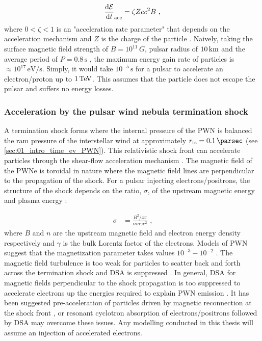 \begin{equation}
    \begin{aligned}
    \dv{\mathcal{E}}{t}_\text{acc}=\zeta Zec^2B\text{ ,}
    \end{aligned}
\end{equation}
where $0<\zeta<1$ is an "acceleration rate parameter" that depends on the acceleration mechanism and $Z$ is the charge of the particle \citep{2022arXiv221116020T}. Naively, taking the surface magnetic field strength of $B=10^{11}\,\si{G}$, pulsar radius of $10\,\si{\kilo\meter}$ and the average period of $P=0.8\,\si{\second}$ \citep{2005AJ....129.1993M}, the maximum energy gain rate of particles is $\approx 10^{17}\,\si{\electronvolt\per\second}$. Simply, it would take $10^{-5}\,\si{\second}$ for a pulsar to accelerate an electron/proton up to $1\,\TeV$. This assumes that the particle does not escape the pulsar and suffers no energy losses.

\subsubsection{Acceleration by the pulsar wind nebula termination shock}

A termination shock forms where the internal pressure of the PWN is balanced the ram pressure of the interstellar wind at approximately $r_\text{ts}=0.1\,\pc$ (see \autoref{sec:01_intro_time_ev_PWN}). This relativistic shock front can accelerate particles through the shear-flow acceleration mechanism \citep{2020A&A...642A.123C,2021ApJ...907L..44S}.
\newpar
The magnetic field of the PWNe is toroidal in nature where the magnetic field lines are perpendicular to the propagation of the shock. For a pulsar injecting electrons/positrons, the structure of the shock depends on the ratio, $\sigma$, of the upstream magnetic energy and plasma energy \citep{1992ApJ...391...73G}:

\begin{equation}
    \begin{aligned}
        \sigma&=\frac{B^2/4\pi}{nm\gamma c^2}\text{ ,}
    \end{aligned}
\end{equation}
\noindent where $B$ and $n$ are the upstream magnetic field and electron energy density respectively and $\gamma$ is the bulk Lorentz factor of the electrons. Models of PWN suggest that the magnetization parameter takes values $10^{-3}-10^{-2}$ \citep{1974MNRAS.167....1R,1984ApJ...283..694K,2004MNRAS.349..779K}. The magnetic field turbulence is too weak for particles to scatter back and forth across the termination shock and DSA is suppressed \citep{2010MNRAS.402..321L,2015SSRv..191..519S}. In general, DSA for magnetic fields perpendicular to the shock propagation is too suppressed to accelerate electrons up the energies required to explain PWN emission \citep{2003APh....19..649M, 2014ApJ...783...91C}. It has been suggested pre-acceleration of particles driven by magnetic reconnection at the shock front \citep{2001ApJ...547..437L,2003MNRAS.345..153L,2016JPlPh..82d6301L}, or resonant cyclotron absorption of electrons/positrons \cite{2001ApJ...547..437L}  followed by DSA may overcome these issues.
\newpar
Any modelling conducted in this thesis will assume an injection of accelerated electrons.


